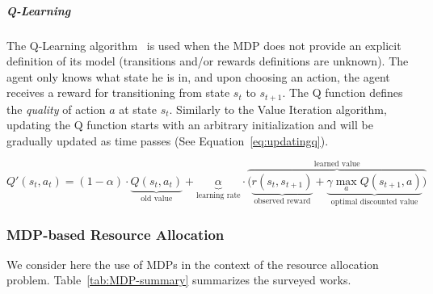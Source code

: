 \subparagraph{Q-Learning}
The Q-Learning algorithm~\cite{qlearning} is used when the MDP does not provide an explicit definition of its model (\ie transitions and/or rewards definitions are unknown).
The agent only knows what state he is in, and upon choosing an action, the agent receives a reward for transitioning from state $s_t$ to $s_{t+1}$.
The Q function defines the \textit{quality} of action $a$ at state $s_t$.
Similarly to the Value Iteration algorithm, updating the Q function starts with an arbitrary initialization and will be gradually updated as time passes (See Equation~\eqref{eq:updatingq}).

\begin{equation}\label{eq:updatingq}
Q'(s_{t},a_{t}) = (1-\alpha) \cdot \underbrace{Q(s_{t},a_{t})}_{\text{old value}} + \underbrace{\alpha}_{\text{learning rate}} \cdot  \overbrace{\bigg( \underbrace{r(s_t,s_{t+1})}_{\text{observed reward}} + \underbrace{\gamma \max_{a}Q(s_{t+1}, a)}_{\text{optimal discounted value}} \bigg) }^{\text{learned value}}
\end{equation}



\subsubsection{MDP-based Resource Allocation}
We consider here the use of MDPs in the context of the resource allocation problem.
Table~\ref{tab:MDP-summary} summarizes the surveyed works.


